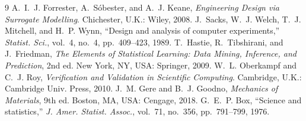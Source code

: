 \documentclass[10pt,journal]{IEEEtran}
\begin{document}
\begin{thebibliography}{9}
 A.~I.~J. Forrester, A.~Sóbester, and A.~J. Keane, \emph{Engineering Design via Surrogate Modelling}. Chichester, U.K.: Wiley, 2008.
 J.~Sacks, W.~J. Welch, T.~J. Mitchell, and H.~P. Wynn, ``Design and analysis of computer experiments,'' \emph{Statist. Sci.}, vol.~4, no.~4, pp.~409--423, 1989.
 T.~Hastie, R.~Tibshirani, and J.~Friedman, \emph{The Elements of Statistical Learning: Data Mining, Inference, and Prediction}, 2nd ed. New York, NY, USA: Springer, 2009.
 W.~L. Oberkampf and C.~J. Roy, \emph{Verification and Validation in Scientific Computing}. Cambridge, U.K.: Cambridge Univ. Press, 2010.
 J.~M. Gere and B.~J. Goodno, \emph{Mechanics of Materials}, 9th ed. Boston, MA, USA: Cengage, 2018.
 G.~E.~P. Box, ``Science and statistics,'' \emph{J. Amer. Statist. Assoc.}, vol.~71, no.~356, pp.~791--799, 1976.
\end{thebibliography}
\end{document}
